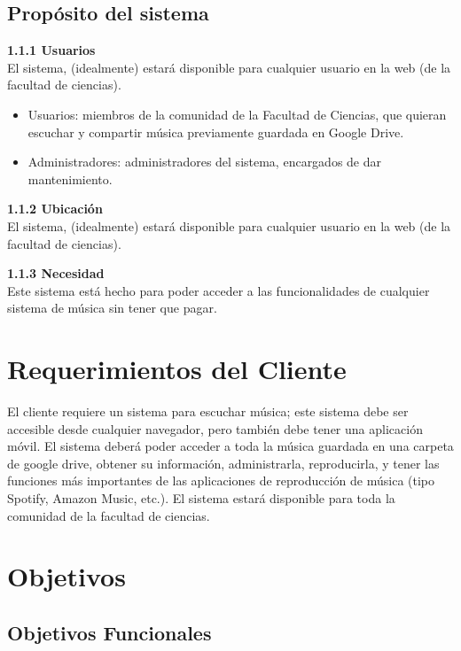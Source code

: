 \documentclass[12pt]{article}
\newcounter{ni}
\begin{document}
\subsection{ Propósito del sistema}

\textbf{1.1.1 Usuarios}\\
El sistema, (idealmente) estará disponible para cualquier usuario en la web (de la facultad de ciencias).

\begin{itemize}
    \item Usuarios: miembros de la comunidad de la Facultad de Ciencias, que quieran escuchar y compartir música previamente guardada en Google Drive.
    \item Administradores: administradores del sistema, encargados de dar mantenimiento.
\end{itemize}

\textbf{1.1.2 Ubicación}\\
El sistema, (idealmente) estará disponible para cualquier usuario en la web (de la facultad de ciencias).

\textbf{1.1.3 Necesidad}\\
Este sistema está hecho para poder acceder a las funcionalidades de cualquier sistema de música sin tener que pagar.

\section{Requerimientos del Cliente}

El cliente requiere un sistema para escuchar música; este sistema debe ser accesible desde cualquier navegador, pero también debe tener una aplicación móvil. El sistema deberá poder acceder a toda la música guardada en una carpeta de google drive, obtener su información, administrarla, reproducirla, y tener las funciones más importantes de las aplicaciones de reproducción de música (tipo Spotify, Amazon Music, etc.).
El sistema estará disponible para toda la comunidad de la facultad de ciencias.





\section{Objetivos}

\subsection{Objetivos Funcionales}
\end{document}
